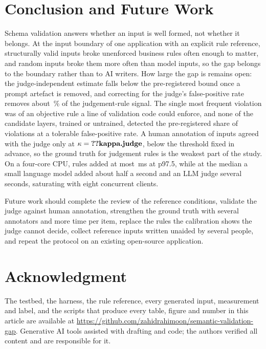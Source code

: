 \documentclass[journal]{IEEEtran}
\begin{document}
\section{Conclusion and Future Work}
\label{sec:conclusion}

Schema validation answers whether an input is well formed, not whether it belongs. At the input
boundary of one application with an explicit rule reference, structurally valid inputs broke unenforced
business rules often enough to matter, and random inputs broke them more often than model inputs, so
the gap belongs to the boundary rather than to AI writers. How large the gap is remains open: the judge-independent estimate falls below the pre-registered
bound once a prompt artefact is removed, and correcting for the judge's false-positive rate removes
about \,\% of the judgement-rule signal. The single most frequent violation was of
an objective rule a line of validation code could enforce,
and none of the candidate layers, trained or untrained, detected the pre-registered share of
violations at a tolerable false-positive rate.\ifjudgeweak{} A human annotation of 
inputs agreed with the judge only at $\kappa=\R{kappa.judge}$, below the threshold fixed in advance,
so the ground truth for judgement rules is the weakest part of the study.\fi{} On a four-core CPU,
rules added at most \,ms at p97.5, while at the median a small language model added
about half a second and an LLM judge several seconds, saturating with eight concurrent clients.

Future work should \ifreviewed\else complete the review of the reference conditions, \fi
\ifhumanlabels\else validate the judge against human annotation, \fi strengthen the ground truth with
several annotators and more time per item, replace the rules the calibration shows the judge cannot
decide, collect reference inputs written unaided by several people, and repeat the protocol on an
existing open-source application.

\section*{Acknowledgment}

The testbed, the harness, the rule reference, every generated input, measurement and label, and the
scripts that produce every table, figure and number in this article are available at
\url{https://github.com/zahidrahimoon/semantic-validation-gap}. Generative AI tools assisted with
drafting and code; the authors verified all content and are responsible for it.



\end{document}
